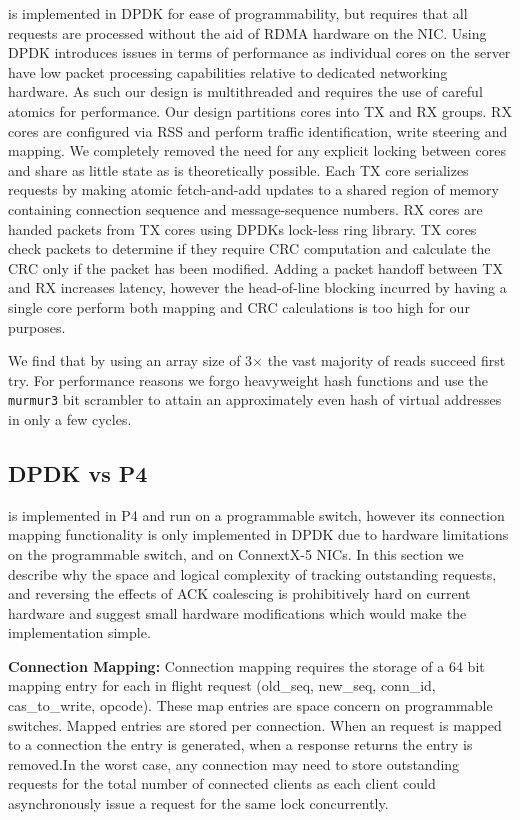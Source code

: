 {\sword} is implemented in DPDK for ease of programmability, but
requires that all requests are processed without the aid of RDMA
hardware on the NIC. Using DPDK introduces issues in terms of
performance as individual cores on the server have low packet
processing capabilities relative to dedicated networking hardware. As
such our design is multithreaded and requires the use of careful
atomics for performance.  Our design partitions cores into TX and RX
groups. RX cores are configured via RSS and perform traffic
identification, write steering and mapping. We completely removed the
need for any explicit locking between cores and share as little state
as is theoretically possible. Each TX core serializes requests by
making atomic fetch-and-add updates to a shared region of memory
containing connection sequence and message-sequence numbers. RX cores
are handed packets from TX cores using DPDKs lock-less ring
library. TX cores check packets to determine if they require CRC
computation and calculate the CRC only if the packet has been
modified. Adding a packet handoff between TX and RX increases latency,
however the head-of-line blocking incurred by having a single core
perform both mapping and CRC calculations is too high for our purposes.

We find that by using an array size of
3$\times$ the vast majority of reads succeed first try.
For
performance reasons we forgo heavyweight hash functions and use
the \texttt{murmur3} bit scrambler to attain an approximately even
hash of virtual addresses in only a few cycles.

\subsection{DPDK vs P4}

{\sword} is implemented in P4 and run on a programmable switch, however its
connection mapping functionality is only implemented in DPDK due to hardware
limitations on the programmable switch, and on ConnextX-5 NICs. In this section
we describe why the space and logical complexity of tracking outstanding
requests, and reversing the effects of ACK coalescing is prohibitively hard on
current hardware and suggest small hardware modifications which would make the
implementation simple.

\textbf{Connection Mapping:} Connection mapping requires the storage of a 64 bit
mapping entry for each in flight request (old\_seq, new\_seq, conn\_id,
cas\_to\_write, opcode). These map entries are space concern on programmable
switches. Mapped entries are stored per connection. When an request is mapped to
a connection the entry is generated, when a response returns the entry is
removed.In the worst case, any connection may need to store outstanding requests
for the total number of connected clients as each client could asynchronously
issue a request for the same lock concurrently. 

